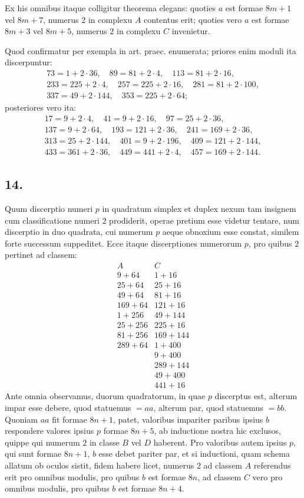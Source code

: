 \documentclass[12pt]{article}
\begin{document}
Ex his omnibus itaque colligitur theorema elegans: quoties $a$ est formae $8m+1$ vel $8m+7$, numerus $2$ in complexu $A$ contentus erit; quoties vero $a$ est formae $8m+3$ vel $8m+5$, numerus $2$ in complexu $C$ invenietur.

Quod confirmatur per exempla in art. praec. enumerata; priores enim moduli ita discerpuntur:
\[
\begin{gathered}
73=1+2\cdot36,\quad 89=81+2\cdot4,\quad 113=81+2\cdot16,\\
233=225+2\cdot4,\quad 257=225+2\cdot16,\quad 281=81+2\cdot100,\\
337=49+2\cdot144,\quad 353=225+2\cdot64;
\end{gathered}
\]
posteriores vero ita:
\[
\begin{gathered}
17=9+2\cdot4,\quad 41=9+2\cdot16,\quad 97=25+2\cdot36,\\
137=9+2\cdot64,\quad 193=121+2\cdot36,\quad 241=169+2\cdot36,\\
313=25+2\cdot144,\quad 401=9+2\cdot196,\quad 409=121+2\cdot144,\\
433=361+2\cdot36,\quad 449=441+2\cdot4,\quad 457=169+2\cdot144.
\end{gathered}
\]

\subsection*{14.}

Quum discerptio numeri $p$ in quadratum simplex et duplex nexum tam insignem cum classificatione numeri $2$ prodiderit, operae pretium esse videtur tentare, num discerptio in duo quadrata, cui numerum $p$ aeque obnoxium esse constat, similem forte successum suppeditet. Ecce itaque discerptiones numerorum $p$, pro quibus $2$ pertinet ad classem:
\[
\begin{array}{c|c}
A & C\\
\hline
9+64&1+16\\
25+64&25+16\\
49+64&81+16\\
169+64&121+16\\
1+256&49+144\\
25+256&225+16\\
81+256&169+144\\
289+64&1+400\\
&9+400\\
&289+144\\
&49+400\\
&441+16
\end{array}
\]
Ante omnia observamus, duorum quadratorum, in quae $p$ discerptus est, alterum impar esse debere, quod statuemus $=aa$, alterum par, quod statuemus $=bb$. Quoniam $aa$ fit formae $8n+1$, patet, valoribus impariter paribus ipsius $b$ respondere valores ipsius $p$ formae $8n+5$, ab inductione nostra hic exclusos, quippe qui numerum $2$ in classe $B$ vel $D$ haberent. Pro valoribus autem ipsius $p$, qui sunt formae $8n+1$, $b$ esse debet pariter par, et si inductioni, quam schema allatum ob oculos sistit, fidem habere licet, numerus $2$ ad classem $A$ referendus erit pro omnibus modulis, pro quibus $b$ est formae $8n$, ad classem $C$ vero pro omnibus modulis, pro quibus $b$ est formae $8n+4$.
\end{document}
